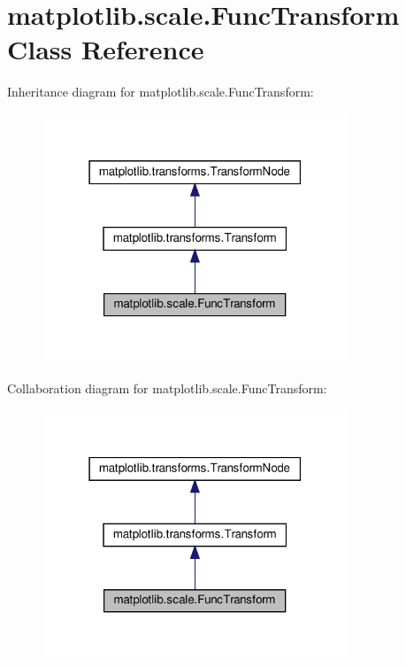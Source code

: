 \hypertarget{classmatplotlib_1_1scale_1_1FuncTransform}{}\section{matplotlib.\+scale.\+Func\+Transform Class Reference}
\label{classmatplotlib_1_1scale_1_1FuncTransform}


Inheritance diagram for matplotlib.\+scale.\+Func\+Transform\+:
\nopagebreak
\begin{figure}[H]
\begin{center}
\leavevmode
\includegraphics[width=259pt]{classmatplotlib_1_1scale_1_1FuncTransform__inherit__graph}
\end{center}
\end{figure}


Collaboration diagram for matplotlib.\+scale.\+Func\+Transform\+:
\nopagebreak
\begin{figure}[H]
\begin{center}
\leavevmode
\includegraphics[width=259pt]{classmatplotlib_1_1scale_1_1FuncTransform__coll__graph}
\end{center}
\end{figure}
